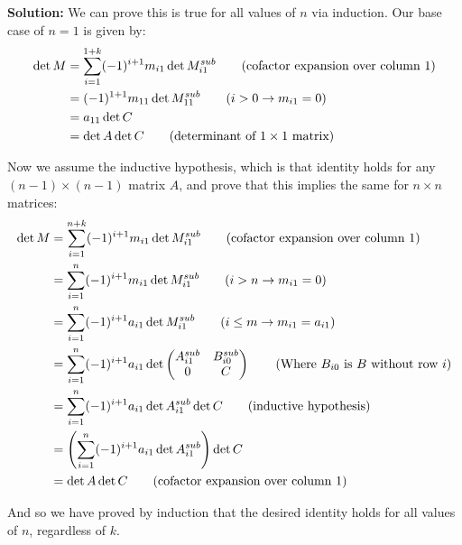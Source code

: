 \documentclass{article}
\begin{document}
\noindent\textbf{Solution:} We can prove this is true for all values of $n$ via induction. Our base case of $n=1$ is given by:
\begin{align*}
  \det M&=\sum_{i=1}^{1+k}(-1)^{i+1}m_{i1}\det M^{sub}_{i1}\tag{cofactor expansion over column 1}\\
  &=(-1)^{1+1}m_{11}\det M^{sub}_{11}\tag{$i>0\rightarrow m_{i1}=0$}\\
  &=a_{11}\det C\\
  &=\det A\det C\tag{determinant of $1\times 1$ matrix}
\end{align*}

Now we assume the inductive hypothesis, which is that identity holds for any $(n-1)\times(n-1)$ matrix $A$, and prove that this implies the same for $n\times n$ matrices:
\begin{align*}
  \det M&=\sum_{i=1}^{n+k}(-1)^{i+1}m_{i1}\det M^{sub}_{i1}\tag{cofactor expansion over column 1}\\
  &=\sum_{i=1}^{n}(-1)^{i+1}m_{i1}\det M^{sub}_{i1}\tag{$i>n\rightarrow m_{i1}=0$}\\
  &=\sum_{i=1}^{n}(-1)^{i+1}a_{i1}\det M^{sub}_{i1}\tag{$i\le m\rightarrow m_{i1}=a_{i1}$}\\
  &=\sum_{i=1}^{n}(-1)^{i+1}a_{i1}\det\begin{pmatrix}
    A^{sub}_{i1}&B_{i0}^{sub}\\
    0&C
  \end{pmatrix}\tag{Where $B_{i0}$ is $B$ without row $i$}\\
  &=\sum_{i=1}^{n}(-1)^{i+1}a_{i1}\det A^{sub}_{i1}\det C\tag{inductive hypothesis}\\
  &=\left(\sum_{i=1}^{n}(-1)^{i+1}a_{i1}\det A^{sub}_{i1}\right)\det C\\
  &=\det A\det C\tag{cofactor expansion over column 1}
\end{align*}

And so we have proved by induction that the desired identity holds for all values of $n$, regardless of $k$.
\end{document}
